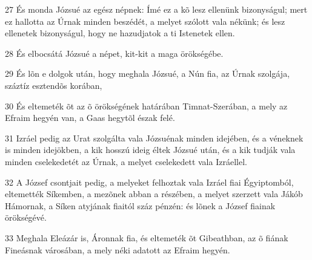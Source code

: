 \par 27 És monda Józsué az egész népnek: Ímé ez a kõ lesz ellenünk bizonyságul; mert ez hallotta az Úrnak minden beszédét, a melyet szólott vala nékünk; és lesz ellenetek bizonyságul, hogy ne hazudjatok a ti Istenetek ellen.
\par 28 És elbocsátá Józsué a népet, kit-kit a maga örökségébe.
\par 29 És lõn e dolgok után, hogy meghala Józsué, a Nún fia, az Úrnak szolgája,  száztíz esztendõs korában,
\par 30 És eltemeték õt az õ örökségének határában Timnat-Szerában, a mely az Efraim hegyén van, a Gaas hegytõl észak felé.
\par 31 Izráel pedig az Urat szolgálta vala Józsuénak minden idejében, és a véneknek is minden idejökben, a kik hosszú ideig éltek Józsué után, és a kik tudják vala minden cselekedetét az Úrnak, a melyet cselekedett vala Izráellel.
\par 32 A József csontjait pedig, a melyeket felhoztak vala Izráel fiai Égyiptomból, eltemették Síkemben, a mezõnek abban a részében, a melyet szerzett vala  Jákób Hámornak, a Síken atyjának fiaitól száz pénzén: és lõnek a József fiainak örökségévé.
\par 33 Meghala Eleázár is, Áronnak fia, és eltemeték õt Gibeathban, az õ fiának Fineásnak városában, a mely néki adatott az Efraim hegyén.



